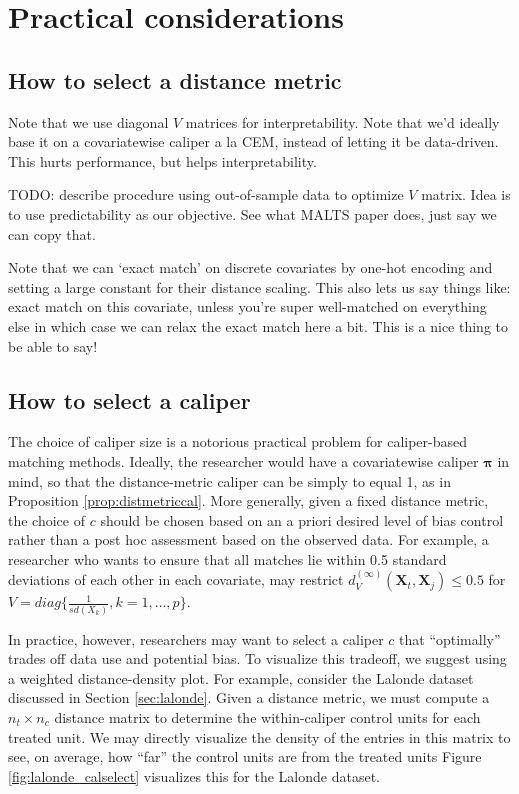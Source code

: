 \documentclass{article}
\newcommand{\Xt}{\mathbf{X}_t}
\newcommand{\Xj}{\mathbf{X}_j}
\begin{document}
\appendix

\section{Practical considerations}

\subsection{How to select a distance metric}
\label{app:metricchoice}

Note that we use diagonal $V$ matrices for interpretability.
Note that we'd ideally base it on a covariatewise caliper a la CEM, instead of letting it be data-driven.
This hurts performance, but helps interpretability.

TODO: describe procedure using out-of-sample data to optimize $V$ matrix.
Idea is to use predictability as our objective.
See what MALTS paper does, just say we can copy that.

Note that we can `exact match' on discrete covariates by one-hot encoding and setting a large constant for their distance scaling.
This also lets us say things like: exact match on this covariate, unless you're super well-matched on everything else in which case we can relax the exact match here a bit.
This is a nice thing to be able to say!


\subsection{How to select a caliper}
\label{app:caliperchoice}

The choice of caliper size is a notorious practical problem for caliper-based matching methods.
Ideally, the researcher would have a covariatewise caliper $\boldsymbol{\pi}$ in mind, so that the distance-metric caliper can be simply to equal 1, as in Proposition \ref{prop:distmetriccal}.
More generally, given a fixed distance metric, the choice of $c$ should be chosen based on an a priori desired level of bias control rather than a post hoc assessment based on the observed data.
For example, a researcher who wants to ensure that all matches lie within 0.5 standard deviations of each other in each covariate, may restrict $d_V^{(\infty)}(\Xt, \Xj) \leq 0.5$ for $V = diag\{\frac{1}{sd(X_k)}, k=1, \dots, p\}$.

In practice, however, researchers may want to select a caliper $c$ that ``optimally'' trades off data use and potential bias.
To visualize this tradeoff, we suggest using a weighted distance-density plot.
For example, consider the Lalonde dataset discussed in Section \ref{sec:lalonde}.
Given a distance metric, we must compute a $n_t \times n_c$ distance matrix to determine the within-caliper control units for each treated unit.
We may directly visualize the density of the entries in this matrix to see, on average, how ``far'' the control units are from the treated units
Figure \ref{fig:lalonde_calselect} visualizes this for the Lalonde dataset.
\end{document}
